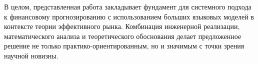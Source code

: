 В целом, представленная работа закладывает фундамент для системного подхода к финансовому прогнозированию
с использованием больших языковых моделей в контексте теории эффективного рынка. Комбинация инженерной
реализации, математического анализа и теоретического обоснования делает предложенное решение не только
практико-ориентированным, но и значимым с точки зрения научной новизны.